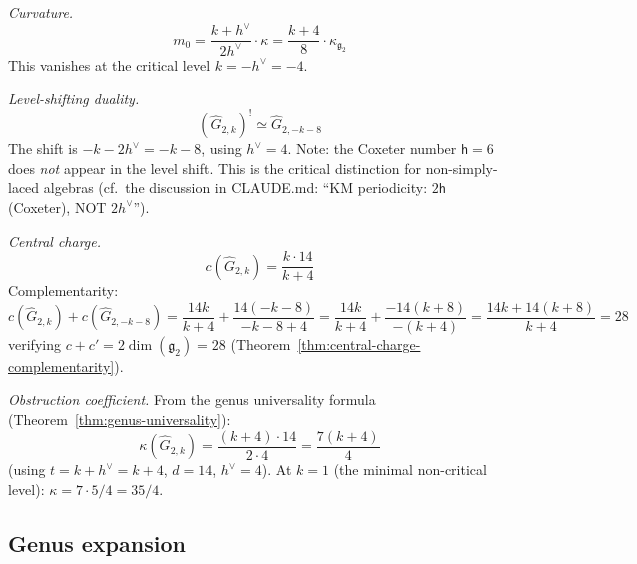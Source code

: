 \begin{computation}
\label{comp:G2-curvature}

\emph{Curvature.}
\begin{equation}
m_0 = \frac{k + h^\vee}{2h^\vee}\cdot\kappa
= \frac{k+4}{8}\cdot\kappa_{\mathfrak{g}_2}
\end{equation}
This vanishes at the critical level $k = -h^\vee = -4$.

\emph{Level-shifting duality.}
\begin{equation}\label{eq:G2-level-shift}
(\widehat{G}_{2,k})^! \simeq \widehat{G}_{2,-k-8}
\end{equation}
The shift is $-k - 2h^\vee = -k - 8$, using $h^\vee = 4$.
Note: the Coxeter number $\mathsf{h} = 6$ does \emph{not} appear in the
level shift.  This is the critical distinction for non-simply-laced
algebras (cf.\ the discussion in
CLAUDE.md: ``KM periodicity: $2\mathsf{h}$ (Coxeter), NOT $2h^\vee$'').

\emph{Central charge.}
\begin{equation}
c(\widehat{G}_{2,k}) = \frac{k \cdot 14}{k + 4}
\end{equation}
Complementarity:
\begin{equation}
c(\widehat{G}_{2,k}) + c(\widehat{G}_{2,-k-8})
= \frac{14k}{k+4} + \frac{14(-k-8)}{-k-8+4}
= \frac{14k}{k+4} + \frac{-14(k+8)}{-(k+4)}
= \frac{14k + 14(k+8)}{k+4} = 28
\end{equation}
verifying $c + c' = 2\dim(\mathfrak{g}_2) = 28$
(Theorem~\ref{thm:central-charge-complementarity}).

\emph{Obstruction coefficient.}
From the genus universality formula
(Theorem~\ref{thm:genus-universality}):
\begin{equation}\label{eq:G2-kappa}
\kappa(\widehat{G}_{2,k}) = \frac{(k+4) \cdot 14}{2 \cdot 4}
= \frac{7(k+4)}{4}
\end{equation}
(using $t = k + h^\vee = k + 4$, $d = 14$, $h^\vee = 4$).
At $k = 1$ (the minimal non-critical level):
$\kappa = 7 \cdot 5/4 = 35/4$.
\end{computation}

\subsection{Genus expansion}

